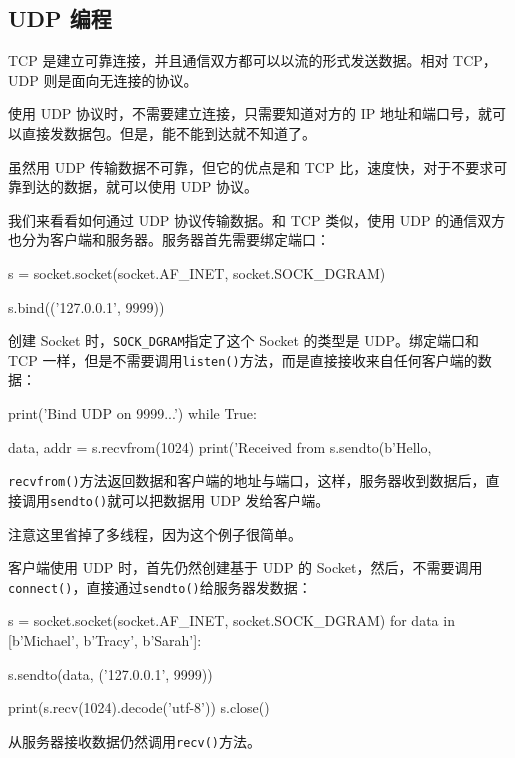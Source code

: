 \hypertarget{udp-ux7f16ux7a0b}{%
\subsection{UDP 编程}\label{udp-ux7f16ux7a0b}}

TCP 是建立可靠连接，并且通信双方都可以以流的形式发送数据。相对 TCP，UDP
则是面向无连接的协议。

使用 UDP 协议时，不需要建立连接，只需要知道对方的 IP
地址和端口号，就可以直接发数据包。但是，能不能到达就不知道了。

虽然用 UDP 传输数据不可靠，但它的优点是和 TCP
比，速度快，对于不要求可靠到达的数据，就可以使用 UDP 协议。

我们来看看如何通过 UDP 协议传输数据。和 TCP 类似，使用 UDP
的通信双方也分为客户端和服务器。服务器首先需要绑定端口：

\begin{pythoncode}
s = socket.socket(socket.AF_INET, socket.SOCK_DGRAM)

s.bind(('127.0.0.1', 9999))
\end{pythoncode}

创建 Socket 时，\texttt{SOCK\_DGRAM}指定了这个 Socket 的类型是
UDP。绑定端口和 TCP
一样，但是不需要调用\texttt{listen()}方法，而是直接接收来自任何客户端的数据：

\begin{pythoncode}
print('Bind UDP on 9999...')
while True:
    
    data, addr = s.recvfrom(1024)
    print('Received from %
    s.sendto(b'Hello, %
\end{pythoncode}

\texttt{recvfrom()}方法返回数据和客户端的地址与端口，这样，服务器收到数据后，直接调用\texttt{sendto()}就可以把数据用
UDP 发给客户端。

注意这里省掉了多线程，因为这个例子很简单。

客户端使用 UDP 时，首先仍然创建基于 UDP 的
Socket，然后，不需要调用\texttt{connect()}，直接通过\texttt{sendto()}给服务器发数据：

\begin{pythoncode}
s = socket.socket(socket.AF_INET, socket.SOCK_DGRAM)
for data in [b'Michael', b'Tracy', b'Sarah']:
    
    s.sendto(data, ('127.0.0.1', 9999))
    
    print(s.recv(1024).decode('utf-8'))
s.close()
\end{pythoncode}

从服务器接收数据仍然调用\texttt{recv()}方法。

